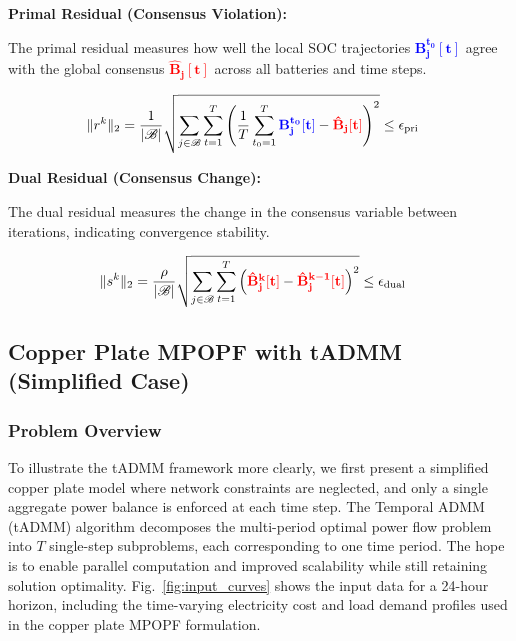 \textbf{Primal Residual (Consensus Violation):}

The primal residual measures how well the local SOC trajectories \textcolor{blue}{$\mathbf{B_j^{t_0}[t]}$} agree with the global consensus \textcolor{red}{$\mathbf{\hat{B}_j[t]}$} across all batteries and time steps.

\begin{align}
\|r^k\|_2 &= \frac{1}{|\mathcal{B}|} \sqrt{\sum_{j \in \mathcal{B}} \sum_{t=1}^T \left( \frac{1}{T} \sum_{t_0=1}^T \textcolor{blue}{\mathbf{B_j^{t_0}[t]}} - \textcolor{red}{\mathbf{\hat{B}_j[t]}} \right)^2} \leq \epsilon_{\text{pri}}
\end{align}

\textbf{Dual Residual (Consensus Change):}

The dual residual measures the change in the consensus variable between iterations, indicating convergence stability.

\begin{align}
\|s^k\|_2 &= \frac{\rho}{|\mathcal{B}|} \sqrt{\sum_{j \in \mathcal{B}} \sum_{t=1}^T \left( \textcolor{red}{\mathbf{\hat{B}_j^k[t]}} - \textcolor{red}{\mathbf{\hat{B}_j^{k-1}[t]}} \right)^2} \leq \epsilon_{\text{dual}}
\end{align}

\subsection{Copper Plate MPOPF with tADMM (Simplified Case)}

\subsubsection{Problem Overview}

To illustrate the tADMM framework more clearly, we first present a simplified copper plate model where network constraints are neglected, and only a single aggregate power balance is enforced at each time step. The Temporal ADMM (tADMM) algorithm decomposes the multi-period optimal power flow problem into $T$ single-step subproblems, each corresponding to one time period. The hope is to enable parallel computation and improved scalability while still retaining solution optimality. Fig.~\ref{fig:input_curves} shows the input data for a 24-hour horizon, including the time-varying electricity cost and load demand profiles used in the copper plate MPOPF formulation.

